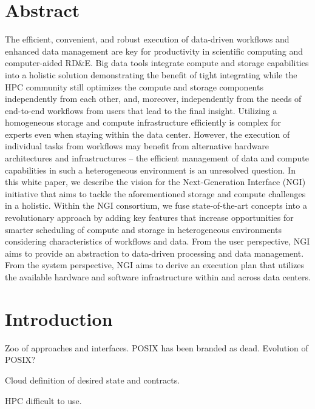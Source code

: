 \documentclass[a4paper, twocolumn]{article}
\title{\papertitle}
\author{Julian M. Kunkel \\
  \textit{University of Reading}
	\and
  A
  \and
  B
  \and
  C
}
\date{\today}
\begin{document}
\maketitle
\thispagestyle{fancy}

\section*{Abstract}

The efficient, convenient, and robust execution of data-driven workflows and enhanced data management are key for productivity in scientific computing and computer-aided RD\&E.
Big data tools integrate compute and storage capabilities into a holistic solution demonstrating the benefit of tight integrating while the HPC community still optimizes the compute and storage components independently from each other, and, moreover, independently from the needs of end-to-end workflows from users that lead to the final insight.
Utilizing a homogeneous storage and compute infrastructure efficiently is complex for experts even when staying within the data center.
However, the execution of individual tasks from workflows may benefit from alternative hardware architectures and infrastructures -- the efficient management of data and compute capabilities in such a heterogeneous environment is an unresolved question.
In this white paper, we describe the vision for the Next-Generation Interface (NGI) initiative that aims to tackle the aforementioned storage and compute challenges in a holistic.
Within the NGI consortium, we fuse state-of-the-art concepts into a revolutionary approach by adding key features that increase opportunities for smarter scheduling of compute and storage in heterogeneous environments considering characteristics of workflows and data.
From the user perspective, NGI aims to provide an abstraction to data-driven processing and data management.
From the system perspective, NGI aims to derive an execution plan that utilizes the available hardware and software infrastructure within and across data centers.

\section{Introduction}

Zoo of approaches and interfaces.
POSIX has been branded as dead.
Evolution of POSIX?

Cloud definition of desired state and contracts.

HPC difficult to use.
\end{document}

